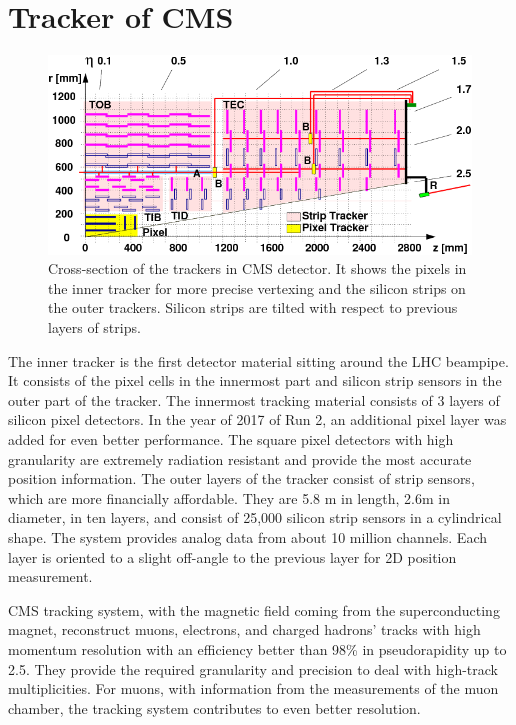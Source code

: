 \section{Tracker of CMS}
\begin{figure}[h!]
	\caption{Cross-section of the trackers in CMS detector. It shows the pixels in the inner tracker for more precise vertexing and the silicon strips on the outer trackers. Silicon strips are tilted with respect to previous layers of strips. \cite{trk}}
  \label{fig:tracker}
  \centering
  \includegraphics[width=0.9\linewidth]{figs/Tracker.png}
\end{figure}

The inner tracker is the first detector material sitting around the LHC beampipe.
It consists of the pixel cells in the innermost part and silicon strip sensors in the outer part of the tracker.
The innermost tracking material consists of 3 layers of silicon pixel detectors.
In the year of 2017 of Run 2, an additional pixel layer was added for even better performance.
The square pixel detectors with high granularity are extremely radiation resistant and provide the most accurate position information.
The outer layers of the tracker consist of strip sensors, which are more financially affordable.
They are 5.8 m in length, 2.6m in diameter, in ten layers, and consist of 25,000 silicon strip sensors in a cylindrical shape.
The system provides analog data from about 10 million channels.
Each layer is oriented to a slight off-angle to the previous layer for 2D position measurement.

CMS tracking system, with the magnetic field coming from the superconducting magnet, reconstruct muons, electrons, and charged hadrons' tracks with high momentum resolution with an efficiency better than 98\% in pseudorapidity up to 2.5.
They provide the required granularity and precision to deal with high-track multiplicities.
For muons, with information from the measurements of the muon chamber, the tracking system contributes to even better resolution.

